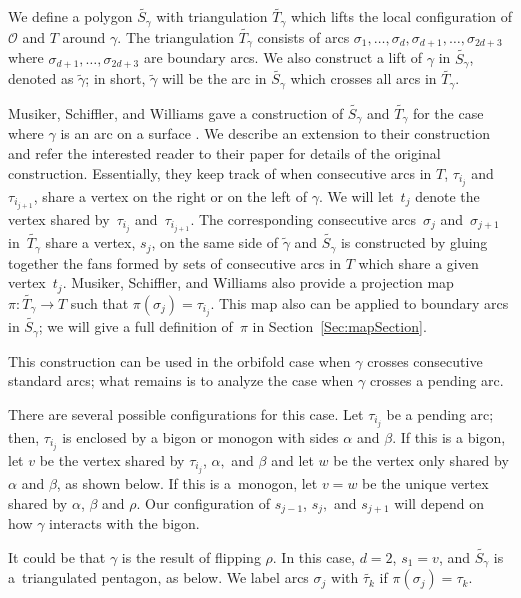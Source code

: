 \documentclass[11pt]{article}
\numberwithin{equation}{section}
\begin{document}
We define a polygon $\widetilde{S_\gamma}$ with triangulation $\widetilde{T_\gamma}$ which lifts the local configuration of $\mathcal{O}$ and $T$ around $\gamma$. The triangulation $\widetilde{T_\gamma}$ consists of arcs $\sigma_1,\ldots, \sigma_d,\sigma_{d+1},\ldots, \sigma_{2d + 3}$ where $\sigma_{d+1},\ldots, \sigma_{2d + 3}$ are boundary arcs. We also construct a lift of $\gamma$ in $\widetilde{S_\gamma}$, denoted as $\widetilde{\gamma}$; in short, $\widetilde{\gamma}$ will be the arc in $\widetilde{S_\gamma}$ which crosses all arcs in $\widetilde{T_\gamma}$.

 Musiker, Schiffler, and Williams gave a construction of $\widetilde{S_\gamma}$ and $\widetilde{T_\gamma}$ for the case where $\gamma$ is an arc on a surface \cite{MSW}. We describe an extension to their construction and refer the interested reader to their paper for details of the original construction. Essentially, they keep track of when consecutive arcs in $T$, $\tau_{i_j}$ and $\tau_{i_{j+1}}$, share a vertex on the right or on the left of $\gamma$. We will let~$t_j$ denote the vertex shared by~$\tau_{i_j}$ and~$\tau_{i_{j+1}}$.
The corresponding consecutive arcs~$\sigma_j$ and~$\sigma_{j+1}$ in~$\widetilde{T_\gamma}$ share a vertex, $s_j$, on the same side of $\widetilde{\gamma}$ and $\widetilde{S_\gamma}$ is constructed by gluing together the fans formed by sets of consecutive arcs in $T$ which share a given vertex~$t_j$. Musiker, Schiffler, and Williams also provide a projection map $\pi\colon \widetilde{T_\gamma} \to T$ such that $\pi(\sigma_j) = \tau_{i_j}$. This map also can be applied to boundary arcs in $\widetilde{S_\gamma}$; we will give a full definition of~$\pi$ in Section~\ref{Sec:mapSection}.

This construction can be used in the orbifold case when $\gamma$ crosses consecutive standard arcs; what remains is to analyze the case when $\gamma$ crosses a pending arc.

There are several possible configurations for this case. Let $\tau_{i_j}$ be a pending arc; then, $\tau_{i_j}$ is enclosed by a bigon or monogon with sides $\alpha$ and $\beta$. If this is a bigon, let $v$ be the vertex shared by $\tau_{i_j}$, $\alpha,$ and $\beta$ and let $w$ be the vertex only shared by $\alpha$ and $\beta$, as shown below. If this is a~monogon, let $v = w$ be the unique vertex shared by $\alpha$, $\beta$ and $\rho$. Our configuration of $s_{j-1}$, $s_j,$ and $s_{j+1}$ will depend on how $\gamma$ interacts with the bigon.

It could be that $\gamma$ is the result of flipping $\rho$. In this case, $d = 2$, $s_1 = v$, and $\widetilde{S_\gamma}$ is a~triangulated pentagon, as below. We label arcs $\sigma_j$ with $\widetilde{\tau_k}$ if $\pi(\sigma_j) = \tau_k$.
\end{document}
